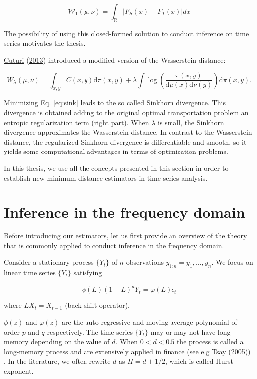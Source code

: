 \documentclass[
  11pt,
]{article}
\begin{document}
\begin{equation}
\mathcal{W}_{1}(\mu, \nu)=\int_{\mathbb{R}}\left|F_{S}(x)-F_{T}(x)\right| d x
\label{eq:wass_1}
\end{equation}

The possibility of using this closed-formed solution to conduct
inference on time series motivates the thesis.

\protect\hyperlink{ref-cuturi2013sinkhorn}{Cuturi}
(\protect\hyperlink{ref-cuturi2013sinkhorn}{2013}) introduced a modified
version of the Wasserstein distance:

\begin{equation}
W_{\lambda}(\mu, \nu) =\int_{x, y} C(x, y) \mathrm{d} \pi(x, y)+ \lambda \int \log \left(\frac{\pi(x, y)}{\mathrm{d} \mu(x) \mathrm{d} \nu(y)}\right) \mathrm{d} \pi(x, y). 
\label{eq:sink}
\end{equation}

Minimizing Eq. \ref{eq:sink} leads to the so called Sinkhorn divergence.
This divergence is obtained adding to the original optimal
transportation problem an entropic regularization term (right part).
When \(\lambda\) is small, the Sinkhorn divergence approximates the
Wasserstein distance. In contrast to the Wasserstein distance, the
regularized Sinkhorn divergence is differentiable and smooth, so it
yields some computational advantages in terms of optimization problems.

In this thesis, we use all the concepts presented in this section in
order to establish new minimum distance estimators in time series
analysis.

\hypertarget{inference-in-the-frequency-domain}{%
\section{Inference in the frequency
domain}\label{inference-in-the-frequency-domain}}

Before introducing our estimators, let us first provide an overview of
the theory that is commonly applied to conduct inference in the
frequency domain.

Consider a stationary process \(\{Y_t\}\) of \(n\) observations
\(y_{1:n} = y_1, … ,y_n\). We focus on linear time series \(\{Y_t\}\)
satisfying

\[
\phi(L)(1-L)^{d} Y_{t}=\varphi(L) \epsilon_{t}
\]

where \(LX_t = X_{t-1}\) (back shift operator).

\(\phi(z)\) and \(\varphi(z)\) are the auto-regressive and moving
average polynomial of order \(p\) and \(q\) respectively. The time
series \(\{Y_t\}\) may or may not have long memory depending on the
value of \(d\). When \(0 < d < 0.5\) the process is called a long-memory
process and are extensively applied in finance (see e.g
\protect\hyperlink{ref-tsay2005analysis}{Tsay}
(\protect\hyperlink{ref-tsay2005analysis}{2005})) . In the literature,
we often rewrite \(d\) as \(H = d +1/2\), which is called Hurst
exponent.
\end{document}
